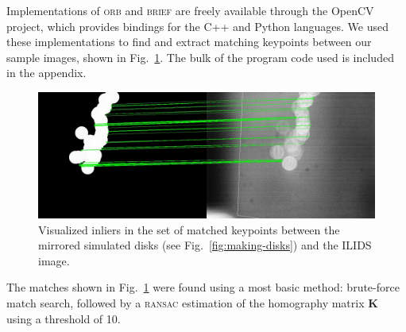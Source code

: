\documentclass[11.5pt,oneside]{book}
\newcommand*{\figref}[1]{Fig.~\ref{#1}}
\begin{document}
Implementations of \textsc{orb} and \textsc{brief} are freely available through
the OpenCV project, which provides bindings for the C++ and Python languages. We
used these implementations to find and extract matching keypoints between our
sample images, shown in \figref{fig:matching}. The bulk of the program code used
is included in the appendix.

\begin{figure}
    \centering
    \includegraphics[width=\textwidth]{img/orb/asift-matching.jpg}
    \caption{Visualized inliers in the set of matched keypoints between the
    mirrored simulated disks (see \figref{fig:making-disks}) and the ILIDS image. \label{fig:matching}}
\end{figure}

The matches shown in \figref{fig:matching} were found using a most basic
method: brute-force match search, followed by a \textsc{ransac} estimation of the
homography matrix $\mathbf{K}$ using a threshold of 10.
\end{document}
